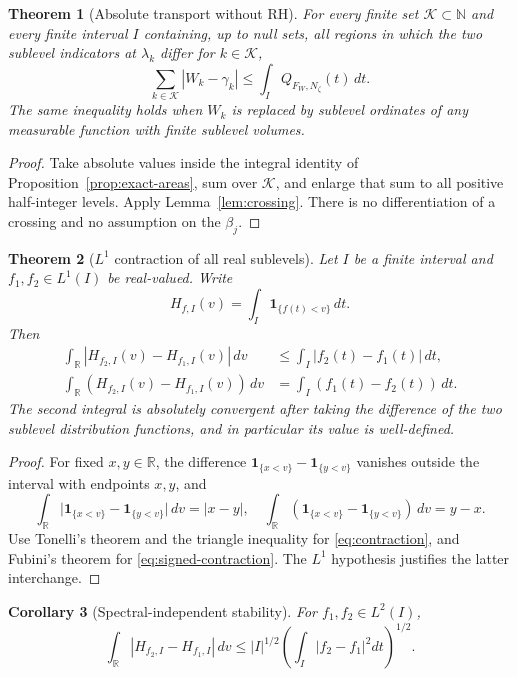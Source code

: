 \documentclass[11pt,leqno]{amsart}
\numberwithin{equation}{section}
\newtheorem{theorem}{Theorem}[section]
\newtheorem{corollary}[theorem]{Corollary}
\theoremstyle{definition}
\theoremstyle{remark}
\newcommand{\R}{\mathbb R}
\newcommand{\N}{\mathbb N}
\newcommand{\1}{\mathbf 1}
\begin{document}
\begin{theorem}[Absolute transport without RH]\label{thm:L1transport}
For every finite set $\mathcal K\subset\N$ and every finite interval $I$ containing, up to null sets, all regions in which the two sublevel indicators at $\lambda_k$ differ for $k\in\mathcal K$,
\begin{equation}\label{eq:L1transport}
 \boxed{\sum_{k\in\mathcal K}|W_k-\gamma_k|
 \le\int_I Q_{F_W,N_\zeta}(t)\,dt.}
\end{equation}
The same inequality holds when $W_k$ is replaced by sublevel ordinates of any measurable function with finite sublevel volumes.
\end{theorem}
\begin{proof}
Take absolute values inside the integral identity of Proposition~\ref{prop:exact-areas}, sum over $\mathcal K$, and enlarge that sum to all positive half-integer levels. Apply Lemma~\ref{lem:crossing}. There is no differentiation of a crossing and no assumption on the $\beta_j$.
\end{proof}
\begin{theorem}[$L^1$ contraction of all real sublevels]\label{thm:contraction}
Let $I$ be a finite interval and $f_1,f_2\in L^1(I)$ be real-valued. Write
\begin{equation}\label{eq:H-def}
 H_{f,I}(v)=\int_I\1_{\{f(t)<v\}}\,dt.
\end{equation}
Then
\begin{align}
 \int_\R|H_{f_2,I}(v)-H_{f_1,I}(v)|\,dv
 &\le\int_I|f_2(t)-f_1(t)|\,dt,\label{eq:contraction}\\
 \int_\R(H_{f_2,I}(v)-H_{f_1,I}(v))\,dv
 &=\int_I(f_1(t)-f_2(t))\,dt.\label{eq:signed-contraction}
\end{align}
The second integral is absolutely convergent after taking the difference of the two sublevel distribution functions, and in particular its value is well-defined.
\end{theorem}
\begin{proof}
For fixed $x,y\in\R$, the difference $\1_{\{x<v\}}-\1_{\{y<v\}}$ vanishes outside the interval with endpoints $x,y$, and
\[
 \int_\R\big|\1_{\{x<v\}}-\1_{\{y<v\}}\big|\,dv=|x-y|,\quad
 \int_\R(\1_{\{x<v\}}-\1_{\{y<v\}})\,dv=y-x.
\]
Use Tonelli's theorem and the triangle inequality for \eqref{eq:contraction}, and Fubini's theorem for \eqref{eq:signed-contraction}. The $L^1$ hypothesis justifies the latter interchange.
\end{proof}
\begin{corollary}[Spectral-independent stability]\label{cor:stability}
For $f_1,f_2\in L^2(I)$,
\begin{equation}\label{eq:stability}
 \int_\R|H_{f_2,I}-H_{f_1,I}|\,dv
 \le |I|^{1/2}\left(\int_I|f_2-f_1|^2dt\right)^{1/2}.
\end{equation}
\end{corollary}
\end{document}
